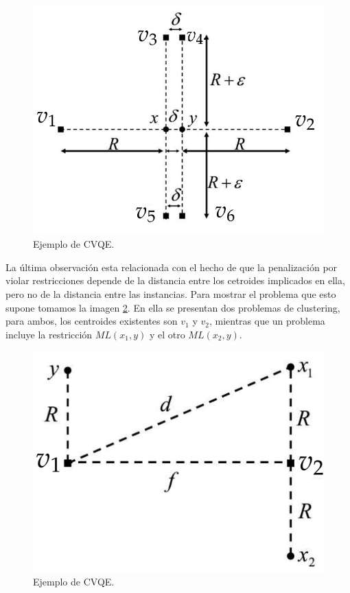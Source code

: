 \begin{figure}[!h]
	\centering
	\includegraphics[scale=0.3]{imagenes/c4/Fig1}
	\caption[Ejemplo de CVQE.]{Ejemplo de CVQE. \cite{LCVQE:2007}}\label{fig:figure19}
\end{figure}

La última observación esta relacionada con el hecho de que la penalización por violar restricciones depende de la distancia entre los cetroides implicados en ella, pero no de la distancia entre las instancias. Para mostrar el problema que esto supone tomamos la imagen \ref{fig:figure20}. En ella se presentan dos problemas de clustering, para ambos, los centroides existentes son $v_1$ y $v_2$, mientras que un problema incluye la restricción $ML(x_1, y)$ y el otro $ML(x_2, y)$.


\begin{figure}[!h]
	\centering
	\includegraphics[scale=0.3]{imagenes/c4/Fig2}
	\caption[Ejemplo de CVQE.]{Ejemplo de CVQE. \cite{LCVQE:2007}}\label{fig:figure20}
\end{figure}

